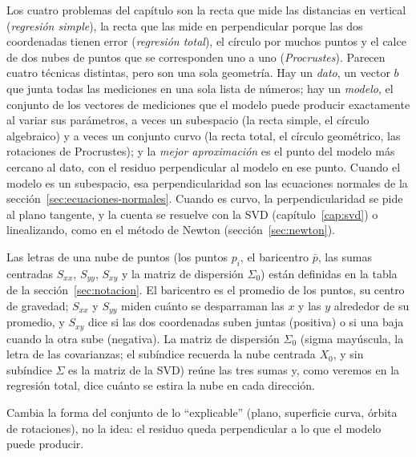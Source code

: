 Los cuatro problemas del capítulo son la recta que mide las distancias en vertical
(\emph{regresión simple}), la recta que las mide en perpendicular porque las dos coordenadas
tienen error (\emph{regresión total}), el círculo por muchos puntos y el calce de dos nubes de
puntos que se corresponden uno a uno (\emph{Procrustes}). Parecen cuatro técnicas distintas,
pero son una sola geometría. Hay un \emph{dato}, un vector \(b\) que junta todas las
mediciones en una sola lista de números; hay un \emph{modelo}, el conjunto de los vectores de
mediciones que el modelo puede producir exactamente al variar sus parámetros, a veces un
subespacio (la recta simple, el círculo algebraico) y a veces un conjunto curvo (la recta
total, el círculo geométrico, las rotaciones de Procrustes); y la \emph{mejor aproximación}
es el punto del modelo más cercano al dato, con el residuo perpendicular al modelo en ese
punto. Cuando el modelo es un subespacio, esa perpendicularidad son las ecuaciones normales de la
sección~\ref{sec:ecuaciones-normales}. Cuando es curvo, la perpendicularidad se pide al plano
tangente, y la cuenta se resuelve con la SVD (capítulo~\ref{cap:svd}) o linealizando, como en
el método de Newton (sección~\ref{sec:newton}).

Las letras de una nube de puntos (los puntos \(p_i\), el baricentro \(\bar p\), las sumas
centradas \(S_{xx}\), \(S_{yy}\), \(S_{xy}\) y la matriz de dispersión \(\Sigma_0\)) están definidas en
la tabla de la sección~\ref{sec:notacion}. El baricentro es el promedio de los puntos, su centro de gravedad; \(S_{xx}\) y
\(S_{yy}\) miden cuánto se desparraman las \(x\) y las \(y\) alrededor de su promedio, y
\(S_{xy}\) dice si las dos coordenadas suben juntas (positiva) o si una baja cuando la otra
sube (negativa). La matriz de dispersión \(\Sigma_0\) (sigma mayúscula, la letra de las covarianzas; el
subíndice recuerda la nube centrada \(X_0\), y sin subíndice \(\Sigma\) es la matriz de la SVD) reúne las tres sumas y, como veremos en la
regresión total, dice cuánto se estira la nube en cada dirección.

\begin{idea}
Cambia la forma del conjunto de lo \enquote{explicable} (plano, superficie curva, órbita de
rotaciones), no la idea: el residuo queda perpendicular a lo que el modelo puede producir.
\end{idea}


